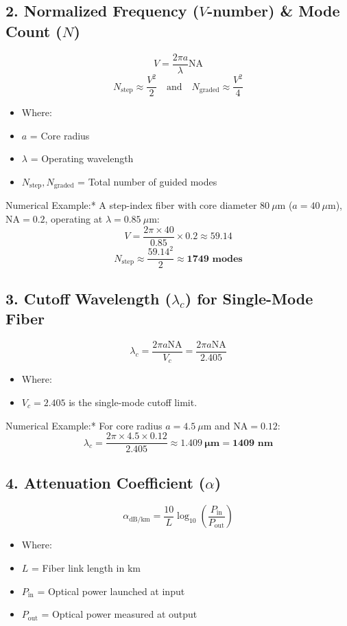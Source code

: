 \subsection{2. Normalized Frequency ($V$-number) \& Mode Count ($N$)}
\[ V = \frac{2\pi a}{\lambda} \text{NA} \]
\[ N_{\text{step}} \approx \frac{V^2}{2} \quad \text{and} \quad N_{\text{graded}} \approx \frac{V^2}{4} \]
\begin{itemize}
  \item   Where:
  \item   $a$ = Core radius
  \item   $\lambda$ = Operating wavelength
  \item   $N_{\text{step}}, N_{\text{graded}}$ = Total number of guided modes
\end{itemize}
\textit{   }Numerical Example:* A step-index fiber with core diameter $80\ \mu\text{m}$ ($a = 40\ \mu\text{m}$), $\text{NA} = 0.2$, operating at $\lambda = 0.85\ \mu\text{m}$:
    \[ V = \frac{2\pi \times 40}{0.85} \times 0.2 \approx \mathbf{59.14} \]
    \[ N_{\text{step}} \approx \frac{59.14^2}{2} \approx \mathbf{1749 \text{ modes}} \]

\subsection{3. Cutoff Wavelength ($\lambda_c$) for Single-Mode Fiber}
\[ \lambda_c = \frac{2\pi a \text{NA}}{V_c} = \frac{2\pi a \text{NA}}{2.405} \]
\begin{itemize}
  \item   Where:
  \item   $V_c = 2.405$ is the single-mode cutoff limit.
\end{itemize}
\textit{   }Numerical Example:* For core radius $a = 4.5\ \mu\text{m}$ and $\text{NA} = 0.12$:
    \[ \lambda_c = \frac{2\pi \times 4.5 \times 0.12}{2.405} \approx \mathbf{1.409\ \mu\text{m}} = \mathbf{1409\text{ nm}} \]

\subsection{4. Attenuation Coefficient ($\alpha$)}
\[ \alpha_{\text{dB/km}} = \frac{10}{L} \log_{10}\left(\frac{P_{\text{in}}}{P_{\text{out}}}\right) \]
\begin{itemize}
  \item   Where:
  \item   $L$ = Fiber link length in $\text{km}$
  \item   $P_{\text{in}}$ = Optical power launched at input
  \item   $P_{\text{out}}$ = Optical power measured at output
\end{itemize}


